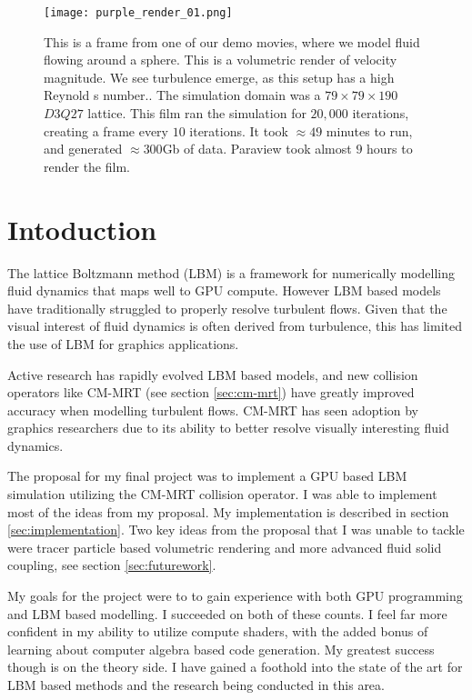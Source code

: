 \begin{figure*}
\begin{center}
  \texttt{[image: purple\_render\_01.png]}
\end{center}
\caption{This is a frame from one of our demo movies,
  where we model fluid flowing around a sphere.
  This is a volumetric render of velocity magnitude. 
  We see turbulence emerge, as this setup has a high Reynold
  s number..
  The simulation domain was a $79 \times 79 \times 190$ 
  $D3Q27$ lattice. 
  This film ran the simulation for $20,000$ iterations,
  creating a frame every $10$ iterations.
It took $\approx 49$ minutes to run, 
and generated $\approx 300$Gb of data.
Paraview took almost $9$ hours to render the film.}
\label{fig:movie-frame}
\end{figure*}

\section{Intoduction}

The lattice Boltzmann method (LBM) 
is a framework for numerically modelling fluid dynamics
that maps well to GPU compute.
However LBM based models have traditionally struggled to 
properly resolve turbulent flows.
Given that the visual interest of fluid dynamics is often 
derived from turbulence, this has limited the use of LBM 
for graphics applications.

Active research has rapidly evolved LBM based models,
and new collision operators like CM-MRT (see section \ref{sec:cm-mrt})
have greatly improved accuracy when modelling turbulent flows.
CM-MRT has seen adoption by graphics 
researchers \cite{Li2020, Li2024, Lyu2021} due
to its ability to better resolve visually interesting
fluid dynamics.

The proposal for my final project was to
implement a GPU based LBM simulation utilizing the CM-MRT collision 
operator.
I was able to implement most of the ideas from
my proposal.
My implementation is described in section 
\ref{sec:implementation}.
Two key ideas from the proposal that I was unable to tackle
were tracer particle based volumetric rendering
and more advanced fluid solid coupling, see section \ref{sec:futurework}.

My goals for the project were to to gain experience with both GPU programming and 
LBM based modelling.
I succeeded on both of these counts.
I feel far more confident in my ability to utilize compute shaders,
with the added bonus of learning about computer algebra based
code generation.
My greatest success though is on the theory side.
I have gained a foothold into
the state of the art for LBM based methods and
the research being conducted in this area.
